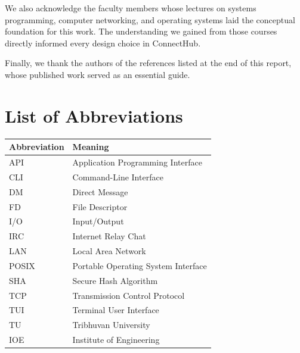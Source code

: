 \documentclass[12pt,a4paper]{report}
\begin{document}
We also acknowledge the faculty members whose lectures on systems programming, computer networking, and operating systems laid the conceptual foundation for this work. The understanding we gained from those courses directly informed every design choice in ConnectHub.

Finally, we thank the authors of the references listed at the end of this report, whose published work served as an essential guide.

\clearpage

\tableofcontents
\clearpage
\listoffigures
\clearpage
\listoftables
\clearpage

\chapter*{List of Abbreviations}
\begin{table}[h!]
\centering
\begin{tabular}{ll}
\toprule
\textbf{Abbreviation} & \textbf{Meaning} \\
\midrule
API & Application Programming Interface \\
CLI & Command-Line Interface \\
DM & Direct Message \\
FD & File Descriptor \\
I/O & Input/Output \\
IRC & Internet Relay Chat \\
LAN & Local Area Network \\
POSIX & Portable Operating System Interface \\
SHA & Secure Hash Algorithm \\
TCP & Transmission Control Protocol \\
TUI & Terminal User Interface \\
TU & Tribhuvan University \\
IOE & Institute of Engineering \\
\bottomrule
\end{tabular}
\end{table}

\clearpage

\setcounter{page}{1}
\end{document}
